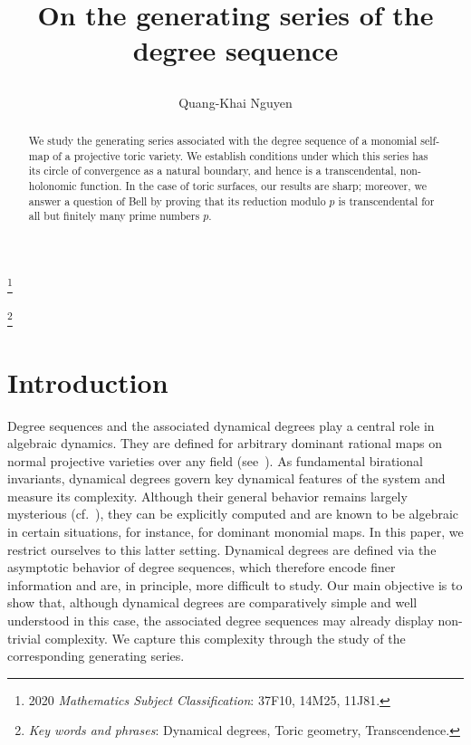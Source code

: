 \documentclass[11pt,a4paper]{article}
\title{On the generating series of the degree sequence\date{\vspace{-2\baselineskip}}
}
\author{{\normalfont  Quang-Khai Nguyen}}
\theoremstyle{plain}
\theoremstyle{remark}
\theoremstyle{custombold}
\begin{document}
\maketitle
\begin{abstract}
	We study the generating series associated with the degree sequence of a monomial self-map of a projective toric variety. We establish conditions under which this series has its circle of convergence as a natural boundary, and hence is a transcendental, non-holonomic function. In the case of toric surfaces, our results are sharp; moreover, we answer a question of Bell by proving that its reduction modulo 
$p$ is transcendental for all but finitely many prime numbers $p$.
\end{abstract}
\newcommand\blfootnote[1]{%
  \begingroup
  \renewcommand\thefootnote{}\footnote{#1}%
  \addtocounter{footnote}{-1}%
  \endgroup
}
\blfootnote{2020 \emph{Mathematics Subject Classification}: 37F10, 14M25, 11J81.}
\blfootnote{\emph{Key words and phrases}: Dynamical degrees, Toric geometry, Transcendence.}
\section{Introduction}\label{Introduction}
Degree sequences and the associated dynamical degrees play a central role in algebraic dynamics.
They are defined for arbitrary dominant rational maps on normal projective varieties over any field (see~\cite{Dinh-Sibony-2005,Truong-2020,Dang-2020}).
As fundamental birational invariants, dynamical degrees govern key dynamical features of the system and measure its complexity.
Although their general behavior remains largely mysterious (cf.~\cite{BDJ-2020}), they can be explicitly computed and are known to be algebraic in certain situations, for instance, for dominant monomial maps. In this paper, we restrict ourselves to this latter setting.
Dynamical degrees are defined via the asymptotic behavior of degree sequences, which therefore encode finer information and are, in principle, more difficult to study.
Our main objective is to show that, although dynamical degrees are comparatively simple and well understood in this case, the associated degree sequences may already display non-trivial complexity.
We capture this complexity through the study of the corresponding generating series.
\end{document}
